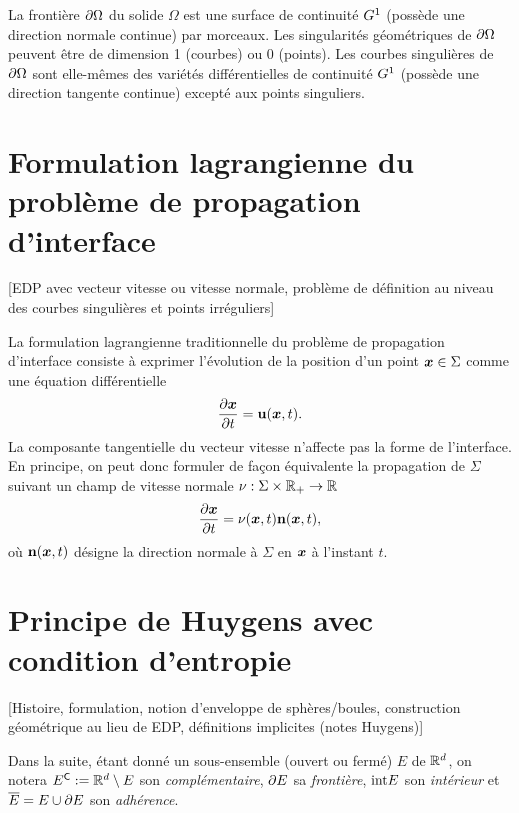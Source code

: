 La frontière $\partial \Omega$ du solide $\Omega$ est une surface de continuité $G^{1}$ (\ie possède une direction normale continue) par morceaux. 
Les singularités géométriques de $\partial \Omega$ peuvent être de dimension 1 (courbes) ou 0 (points).
Les courbes singulières de $\partial \Omega$ sont elle-mêmes des variétés différentielles de continuité $G^{1}$ (\ie possède une direction tangente continue) excepté aux points singuliers.


\section{Formulation lagrangienne du problème de propagation d'interface}
[EDP avec vecteur vitesse ou vitesse normale, problème de définition au niveau des courbes singulières et points irréguliers]
\par\bigskip
La formulation lagrangienne traditionnelle du problème de propagation d'interface consiste à exprimer l'évolution de la position d'un point $\boldsymbol{x} \in \Sigma$ comme une équation différentielle
\begin{equation}
	\frac{\partial \boldsymbol{x}}{\partial t} = \mathbf{u}(\boldsymbol{x},t).
	\label{eq:lagrange_vecteur_vitesse}
\end{equation}
La composante tangentielle du vecteur vitesse n'affecte pas la forme de l'interface. 
En principe, on peut donc formuler de façon équivalente la propagation de $\Sigma$ suivant un champ de vitesse normale $\nu : \Sigma \times \mathbb{R}_+ \to \mathbb{R}$
\begin{equation}
	\frac{\partial \boldsymbol{x}}{\partial t} = \nu(\boldsymbol{x},t) \mathbf{n}(\boldsymbol{x},t),
	\label{eq:lagrange_vitesse_normale}
\end{equation}
où $\mathbf{n}(\boldsymbol{x},t)$ désigne la direction normale à $\Sigma$ en $\boldsymbol{x}$ à l'instant $t$.
\par






\section{Principe de Huygens avec condition d'entropie}
\label{section:principe_huygens}
[Histoire, formulation, notion d'enveloppe de sphères/boules, construction géométrique au lieu de EDP, définitions implicites (\cf notes Huygens)]
\par\bigskip

Dans la suite, étant donné un sous-ensemble (ouvert ou fermé) $E$ de $\mathbb{R}^d$, on notera $E^\mathsf{C} := \mathbb{R}^d \setminus E$ son \textit{complémentaire}, $\partial E$ sa \textit{frontière}, $\mathrm{int}{E}$ son \textit{intérieur} et $\overline{E} = E \cup \partial E$ son \textit{adhérence}.
\par\bigskip

